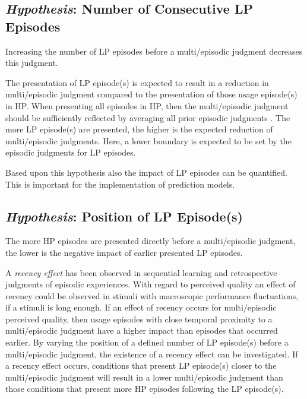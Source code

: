 \subsection[H1: Number of Consecutive \acs{LP} Episodes]{\emph{Hypothesis}: Number of Consecutive \acs{LP} Episodes}
\begin{hypothesis}\label{hypo:number}
Increasing the number of \ac{LP} episodes before a multi\-/episodic judgment decreases this judgment.
\end{hypothesis}

The presentation of \ac{LP} episode(s) is expected to result in a reduction in multi\-/episodic judgment compared to the presentation of those usage episode(s) in \ac{HP}.
When presenting all episodes in \ac{HP}, then the multi\-/episodic judgment should be sufficiently reflected by averaging all prior episodic judgments \citep[\cf,][]{moller_single-call_2011}.
The more \ac{LP} episode(s) are presented, the higher is the expected reduction of multi\-/episodic judgments.
Here, a lower boundary is expected to be set by the episodic judgments for \ac{LP} episodes.

Based upon this hypothesis also the impact of \ac{LP} episodes can be quantified.
This is important for the implementation of prediction models.


\subsection[H2: Position of \acs{LP} Episode(s)]{\emph{Hypothesis}: Position of \acs{LP} Episode(s)}
\begin{hypothesis}\label{hypo:position}
The more \ac{HP} episodes are presented directly before a multi\-/episodic judgment, the lower is the negative impact of earlier presented \ac{LP} episodes.
\end{hypothesis}

A \emph{recency effect} has been observed in sequential learning and retrospective judgments of episodic experiences.
With regard to perceived quality an effect of recency could be observed in stimuli with macroscopic performance fluctuations, if a stimuli is long enough.
If an effect of recency occurs for multi\-/episodic perceived quality, then usage episodes with close temporal proximity to a multi\-/episodic judgment have a higher impact than episodes that occurred earlier.
By varying the position of a defined number of \ac{LP} episode(s) before a multi\-/episodic judgment, the existence of a recency effect can be investigated.
If a recency effect occurs, conditions that present \ac{LP} episode(s) closer to the multi\-/episodic judgment will result in a lower multi\-/episodic judgment than those conditions that present more \ac{HP} episodes following the \ac{LP} episode(s).

